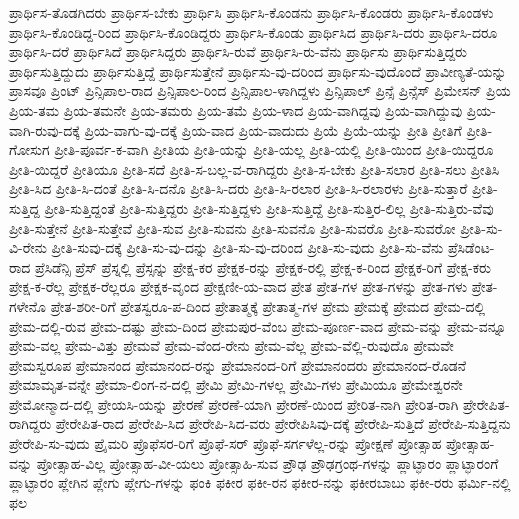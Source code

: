 {ಪ್ರಾರ್ಥಿಸ-ತೊಡಗಿದರು
ಪ್ರಾರ್ಥಿಸ-ಬೇಕು
ಪ್ರಾರ್ಥಿಸಿ
ಪ್ರಾರ್ಥಿಸಿ-ಕೊಂಡನು
ಪ್ರಾರ್ಥಿಸಿ-ಕೊಂಡರು
ಪ್ರಾರ್ಥಿಸಿ-ಕೊಂಡಳು
ಪ್ರಾರ್ಥಿಸಿ-ಕೊಂಡಿದ್ದ-ರಿಂದ
ಪ್ರಾರ್ಥಿಸಿ-ಕೊಂಡಿದ್ದರು
ಪ್ರಾರ್ಥಿಸಿ-ಕೊಂಡು
ಪ್ರಾರ್ಥಿಸಿದ
ಪ್ರಾರ್ಥಿಸಿ-ದರು
ಪ್ರಾರ್ಥಿಸಿ-ದರೂ
ಪ್ರಾರ್ಥಿಸಿ-ದರೆ
ಪ್ರಾರ್ಥಿಸಿದೆ
ಪ್ರಾರ್ಥಿಸಿದ್ದರು
ಪ್ರಾರ್ಥಿಸಿ-ರುವೆ
ಪ್ರಾರ್ಥಿಸಿ-ರು-ವೆನು
ಪ್ರಾರ್ಥಿಸು
ಪ್ರಾರ್ಥಿಸುತ್ತಿದ್ದರು
ಪ್ರಾರ್ಥಿಸುತ್ತಿದ್ದುದು
ಪ್ರಾರ್ಥಿಸುತ್ತಿದ್ದೆ
ಪ್ರಾರ್ಥಿಸುತ್ತೇನೆ
ಪ್ರಾರ್ಥಿಸು-ವು-ದರಿಂದ
ಪ್ರಾರ್ಥಿಸು-ವುದೊಂದೆ
ಪ್ರಾವೀಣ್ಯತೆ-ಯನ್ನು
ಪ್ರಾಸವೂ
ಪ್ರಿಂಟ್
ಪ್ರಿನ್ಸಿಪಾಲ-ರಾದ
ಪ್ರಿನ್ಸಿಪಾಲ-ರಿಂದ
ಪ್ರಿನ್ಸಿಪಾಲ-ಳಾಗಿದ್ದಳು
ಪ್ರಿನ್ಸಿಪಾಲ್
ಪ್ರಿನ್ಸೆ
ಪ್ರಿನ್ಸೆಸ್
ಪ್ರಿಮೇಸನ್
ಪ್ರಿಯ
ಪ್ರಿಯ-ತಮ
ಪ್ರಿಯ-ತಮನೇ
ಪ್ರಿಯ-ತಮರು
ಪ್ರಿಯ-ತಮೆ
ಪ್ರಿಯ-ಳಾದ
ಪ್ರಿಯ-ವಾಗಿದ್ದವು
ಪ್ರಿಯ-ವಾಗಿದ್ದುವು
ಪ್ರಿಯ-ವಾಗಿ-ರುವು-ದಕ್ಕೆ
ಪ್ರಿಯ-ವಾಗು-ವು-ದಕ್ಕೆ
ಪ್ರಿಯ-ವಾದ
ಪ್ರಿಯ-ವಾದುದು
ಪ್ರಿಯೆ
ಪ್ರಿಯೆ-ಯನ್ನು
ಪ್ರೀತಿ
ಪ್ರೀತಿಗೆ
ಪ್ರೀತಿ-ಗೋಸುಗ
ಪ್ರೀತಿ-ಪೂರ್ವ-ಕ-ವಾಗಿ
ಪ್ರೀತಿಯ
ಪ್ರೀತಿ-ಯನ್ನು
ಪ್ರೀತಿ-ಯಲ್ಲ
ಪ್ರೀತಿ-ಯಲ್ಲಿ
ಪ್ರೀತಿ-ಯಿಂದ
ಪ್ರೀತಿ-ಯಿದ್ದರೂ
ಪ್ರೀತಿ-ಯಿದ್ದರೆ
ಪ್ರೀತಿಯೂ
ಪ್ರೀತಿ-ಸದೆ
ಪ್ರೀತಿ-ಸ-ಬಲ್ಲ-ವ-ರಾಗಿದ್ದರು
ಪ್ರೀತಿ-ಸ-ಬೇಕು
ಪ್ರೀತಿ-ಸಲಾರ
ಪ್ರೀತಿ-ಸಲು
ಪ್ರೀತಿಸಿ
ಪ್ರೀತಿ-ಸಿದ
ಪ್ರೀತಿ-ಸಿ-ದಂತೆ
ಪ್ರೀತಿ-ಸಿ-ದನೊ
ಪ್ರೀತಿ-ಸಿ-ದರು
ಪ್ರೀತಿ-ಸಿ-ರಲಾರ
ಪ್ರೀತಿ-ಸಿ-ರಲಾರಳು
ಪ್ರೀತಿ-ಸುತ್ತಾರೆ
ಪ್ರೀತಿ-ಸುತ್ತಿದ್ದ
ಪ್ರೀತಿ-ಸುತ್ತಿದ್ದಂತೆ
ಪ್ರೀತಿ-ಸುತ್ತಿದ್ದರು
ಪ್ರೀತಿ-ಸುತ್ತಿದ್ದಳು
ಪ್ರೀತಿ-ಸುತ್ತಿದ್ದೆ
ಪ್ರೀತಿ-ಸುತ್ತಿರ-ಲಿಲ್ಲ
ಪ್ರೀತಿ-ಸುತ್ತಿರು-ವೆವು
ಪ್ರೀತಿ-ಸುತ್ತೇನೆ
ಪ್ರೀತಿ-ಸುತ್ತೇವೆ
ಪ್ರೀತಿ-ಸುವ
ಪ್ರೀತಿ-ಸುವನು
ಪ್ರೀತಿ-ಸುವನೊ
ಪ್ರೀತಿ-ಸುವರೊ
ಪ್ರೀತಿ-ಸುವರೋ
ಪ್ರೀತಿ-ಸು-ವಿ-ರೇನು
ಪ್ರೀತಿ-ಸುವು-ದಕ್ಕೆ
ಪ್ರೀತಿ-ಸು-ವು-ದನ್ನು
ಪ್ರೀತಿ-ಸು-ವು-ದರಿಂದ
ಪ್ರೀತಿ-ಸು-ವುದು
ಪ್ರೀತಿ-ಸು-ವೆನು
ಪ್ರೆಸಿಡೆಂಟ-ರಾದ
ಪ್ರೆಸಿಡೆನ್ಸಿ
ಪ್ರೆಸ್
ಪ್ರೆಸ್ನಲ್ಲಿ
ಪ್ರೆಸ್ಸನ್ನು
ಪ್ರೇಕ್ಷ-ಕರ
ಪ್ರೇಕ್ಷಕ-ರನ್ನು
ಪ್ರೇಕ್ಷಕ-ರಲ್ಲಿ
ಪ್ರೇಕ್ಷ-ಕ-ರಿಂದ
ಪ್ರೇಕ್ಷಕ-ರಿಗೆ
ಪ್ರೇಕ್ಷ-ಕರು
ಪ್ರೇಕ್ಷ-ಕ-ರೆಲ್ಲ
ಪ್ರೇಕ್ಷಕ-ರೆಲ್ಲರೂ
ಪ್ರೇಕ್ಷಕ-ವೃಂದ
ಪ್ರೇಕ್ಷಣೀ-ಯ-ವಾದ
ಪ್ರೇತ
ಪ್ರೇತ-ಗಳ
ಪ್ರೇತ-ಗಳನ್ನು
ಪ್ರೇತ-ಗಳು
ಪ್ರೇತ-ಗಳೇನೊ
ಪ್ರೇತ-ಶರೀ-ರಿಗೆ
ಪ್ರೇತಸ್ವರೂ-ಪ-ದಿಂದ
ಪ್ರೇತಾತ್ಮಕ್ಕೆ
ಪ್ರೇತಾತ್ಮ-ಗಳ
ಪ್ರೇಮ
ಪ್ರೇಮಕ್ಕೆ
ಪ್ರೇಮದ
ಪ್ರೇಮ-ದಲ್ಲಿ
ಪ್ರೇಮ-ದಲ್ಲಿ-ರುವ
ಪ್ರೇಮ-ದಷ್ಟು
ಪ್ರೇಮ-ದಿಂದ
ಪ್ರೇಮಪುರ-ವೆಂಬ
ಪ್ರೇಮ-ಪೂರ್ಣ-ವಾದ
ಪ್ರೇಮ-ವನ್ನು
ಪ್ರೇಮ-ವನ್ನೂ
ಪ್ರೇಮ-ವಲ್ಲ
ಪ್ರೇಮ-ವಿತ್ತು
ಪ್ರೇಮವೆ
ಪ್ರೇಮ-ವೆಂದ-ರೇನು
ಪ್ರೇಮ-ವೆಲ್ಲ
ಪ್ರೇಮ-ವೆಲ್ಲಿ-ರುವುದೊ
ಪ್ರೇಮವೇ
ಪ್ರೇಮಸ್ವರೂಪ
ಪ್ರೇಮಾನಂದ
ಪ್ರೇಮಾನಂದ-ರನ್ನು
ಪ್ರೇಮಾನಂದ-ರಿಗೆ
ಪ್ರೇಮಾನಂದರು
ಪ್ರೇಮಾನಂದ-ರೊಡನೆ
ಪ್ರೇಮಾಮೃತ-ವನ್ನೇ
ಪ್ರೇಮಾ-ಲಿಂಗ-ನ-ದಲ್ಲಿ
ಪ್ರೇಮಿ
ಪ್ರೇಮಿ-ಗಳಲ್ಲ
ಪ್ರೇಮಿ-ಗಳು
ಪ್ರೇಮಿಯೂ
ಪ್ರೇಮೇಶ್ವರನೇ
ಪ್ರೇಮೋನ್ಮಾದ-ದಲ್ಲಿ
ಪ್ರೇಯಸಿ-ಯನ್ನು
ಪ್ರೇರಣೆ
ಪ್ರೇರಣೆ-ಯಾಗಿ
ಪ್ರೇರಣೆ-ಯಿಂದ
ಪ್ರೇರಿತ-ನಾಗಿ
ಪ್ರೇರಿತ-ರಾಗಿ
ಪ್ರೇರೇಪಿತ-ರಾಗಿದ್ದರು
ಪ್ರೇರೇಪಿತ-ರಾದ
ಪ್ರೇರೇಪಿ-ಸಿದ
ಪ್ರೇರೇಪಿ-ಸಿದ-ವರು
ಪ್ರೇರೇಪಿಸಿವು-ದಕ್ಕೆ
ಪ್ರೇರೇಪಿ-ಸುತ್ತಿದೆ
ಪ್ರೇರೇಪಿ-ಸುತ್ತಿದ್ದನು
ಪ್ರೇರೇಪಿ-ಸು-ವುದು
ಪ್ರೈಮರಿ
ಪ್ರೊಫೆಸರ-ರಿಗೆ
ಪ್ರೊಫೆ-ಸರ್
ಪ್ರೊಫೆ-ಸರ್ಗಳೆಲ್ಲ-ರನ್ನು
ಪ್ರೋಕ್ಷಣೆ
ಪ್ರೋತ್ಸಾಹ
ಪ್ರೋತ್ಸಾಹ-ವನ್ನು
ಪ್ರೋತ್ಸಾಹ-ವಿಲ್ಲ
ಪ್ರೋತ್ಸಾಹ-ವೀ-ಯಲು
ಪ್ರೋತ್ಸಾಹಿ-ಸುವ
ಪ್ರೌಢ
ಪ್ರೌಢಗ್ರಂಥ-ಗಳನ್ನು
ಪ್ಲಾಟ್ಫಾರಂ
ಪ್ಲಾಟ್ಫಾರಂಗೆ
ಪ್ಲಾಟ್ಫಾರಂ
ಪ್ಲೇಗಿನ
ಪ್ಲೇಗು
ಪ್ಲೇಗು-ಗಳನ್ನು
ಫಂಕಿ
ಫಕೀರ
ಫಕೀ-ರನ
ಫಕೀರ-ನನ್ನು
ಫಕೀರಬಾಬು
ಫಕೀ-ರರು
ಫರ್ಮಿ-ನಲ್ಲಿ
ಫಲ
}
